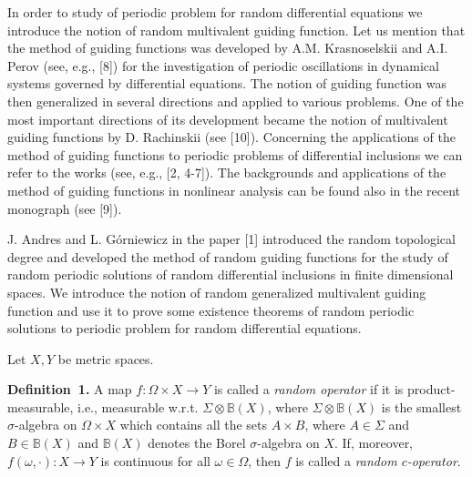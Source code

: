 







\vzmscaption

In order to study of periodic problem for random differential equations we introduce the notion of random multivalent guiding function. Let us mention that the method of guiding functions was developed by A.M. Krasnoselskii and A.I. Perov (see, e.g., [8]) for the investigation of periodic oscillations in dynamical systems governed by differential equations. The notion of guiding function was then generalized in several directions and applied to various problems. One of the most important directions of its development became the notion of multivalent guiding functions by D. Rachinskii (see [10]). Concerning the applications of the method of guiding functions to periodic problems of differential inclusions we can refer to the works (see, e.g., [2, 4-7]). The backgrounds and applications of the method of guiding functions in nonlinear analysis can be found also in the recent monograph (see [9]).

 J. Andres and L. G\'orniewicz in the paper [1] introduced the random topological degree and developed the method of random guiding functions for the study of random periodic solutions of random differential inclusions in finite dimensional spaces. We introduce the notion of random generalized multiva\-lent guiding function and use it to prove some existence theorems of random periodic solutions to periodic problem for random differential equations.

Let $X,Y$ be metric spaces.

\textbf{Definition~1.} A map $f\colon\Omega\times X\to Y$ is called a {\it random operator} if it is product-measurable, i.e., measurable w.r.t. $\Sigma\otimes\mathbb{B}(X)$, where $\Sigma\otimes\mathbb{B}(X)$ is the smallest $\sigma$-algebra on $\Omega\times X$ which contains all the sets $A\times B$, where $A\in\Sigma$ and $B\in\mathbb{B}(X)$ and $\mathbb{B}(X)$ denotes the Borel $\sigma$-algebra on $X$. If, moreover, $f(\omega,\cdot)\colon X\to Y$ is continuous for all $\omega\in\Omega$, then $f$ is called a {\it random $c$-operator}.

